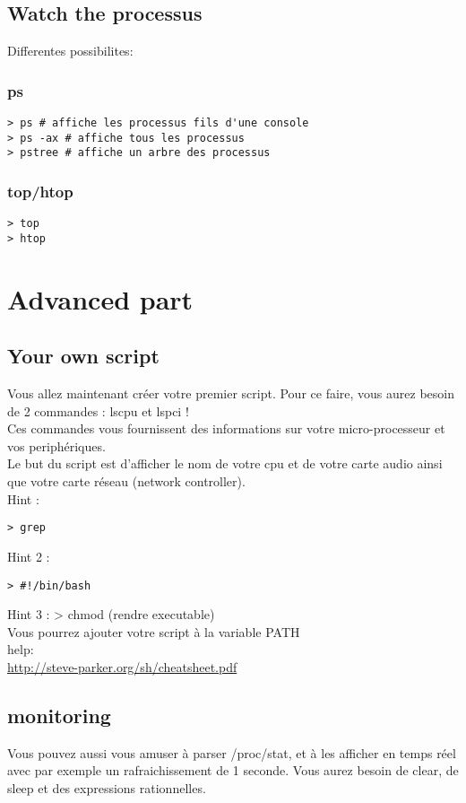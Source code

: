 \documentclass[a4paper]{article}
\begin{document}
\subsection{Watch the processus}
Differentes possibilites:
\subsubsection{ps}
\begin{lstlisting}
> ps # affiche les processus fils d'une console
> ps -ax # affiche tous les processus
> pstree # affiche un arbre des processus
\end{lstlisting}
\subsubsection{top/htop}
\begin{lstlisting}
> top
> htop
\end{lstlisting}
\section{Advanced part}

\subsection{Your own script}
Vous allez maintenant créer votre premier script. Pour ce faire, vous aurez 
besoin de 2 commandes : lscpu et lspci !\\
Ces commandes vous fournissent des informations sur votre micro-processeur et 
vos periphériques.\\
Le but du script est d'afficher le nom de votre cpu et de votre carte audio 
ainsi que votre carte réseau (network controller).\\
Hint : 
\begin{lstlisting}
> grep 
\end{lstlisting}
Hint 2 : 
\begin{lstlisting}
> #!/bin/bash
\end{lstlisting}
Hint 3 :
> chmod (rendre executable)
\\
Vous pourrez ajouter votre script à la variable PATH\\
help: \\
\url{http://steve-parker.org/sh/cheatsheet.pdf}

\subsection{monitoring}
Vous pouvez aussi vous amuser à parser /proc/stat, et à les afficher
en temps réel avec par exemple un rafraichissement de 1 seconde.
Vous aurez besoin de clear, de sleep et des expressions rationnelles.
\end{document}
